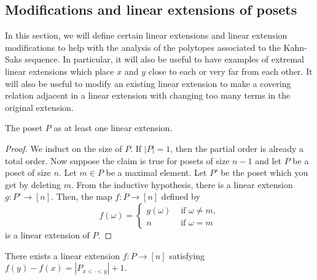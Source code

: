 \documentclass{puthesis-UG}
\begin{document}
\subsection{Modifications and linear extensions of posets}

In this section, we will define certain linear extensions and linear extension modifications to help with the analysis of the polytopes associated to the Kahn-Saks sequence. In particular, it will also be useful to have examples of extremal linear extensions which place $x$ and $y$ close to each or very far from each other. It will also be useful to modify an existing linear extension to make a covering relation adjacent in a linear extension with changing too many terms in the original extension. 

\begin{prop} \label{extension-exists}
    The poset $P$ as at least one linear extension.
\end{prop}

\begin{proof}
    We induct on the size of $P$. If $|P| = 1$, then the partial order is already a total order. Now suppose the claim is true for posets of size $n-1$ and let $P$ be a poset of size $n$. Let $m \in P$ be a maximal element. Let $P'$ be the poset which you get by deleting $m$. From the inductive hypothesis, there is a linear extension $g : P' \to [n]$. Then, the map $f : P \to [n]$ defined by 
    \[
        f(\omega) = 
        \begin{cases}
            g(\omega) & \text{ if $\omega \neq m$}, \\
            n & \text{ if $\omega = m$}
        \end{cases}
    \]
    is a linear extension of $P$.
\end{proof}

\begin{prop} \label{extension-narrow-exists}
    There exists a linear extension $f : P \to [n]$ satisfying $f(y) - f(x) = |P_{x < \cdot < y}| + 1$. 
\end{prop}
\end{document}
